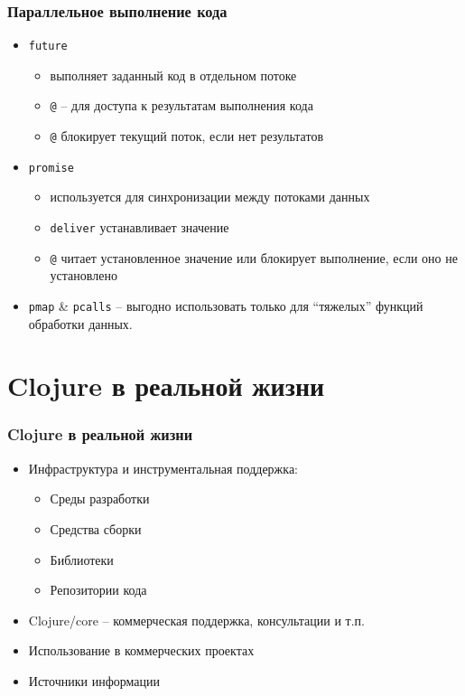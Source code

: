\documentclass[ignorenonframetext]{beamer}
\begin{document}
\begin{frame}[t,fragile]
  \frametitle{Параллельное выполнение кода}
  \begin{itemize}
  \item \texttt{future}
    \begin{itemize}
    \item выполняет заданный код в отдельном потоке
    \item \lstinline|@| -- для доступа к результатам выполнения кода
    \item \lstinline|@| блокирует текущий поток, если нет результатов
    \end{itemize}
  \item \texttt{promise}
    \begin{itemize}
    \item используется для синхронизации между потоками данных
    \item \texttt{deliver} устанавливает значение
    \item \lstinline|@| читает установленное значение или блокирует выполнение, если оно
      не установлено
    \end{itemize}
  \item \texttt{pmap} \& \texttt{pcalls} -- выгодно использовать только для ``тяжелых''
    функций обработки данных.
  \end{itemize}
\end{frame}

\section{Clojure в реальной жизни}

\begin{frame}[t]
  \frametitle{Clojure в реальной жизни}
  \begin{itemize}
  \item Инфраструктура и инструментальная поддержка:
    \begin{itemize}
    \item Среды разработки
    \item Средства сборки
    \item Библиотеки
    \item Репозитории кода
    \end{itemize}
  \item Clojure/core -- коммерческая поддержка, консультации и т.п.
  \item Использование в коммерческих проектах
  \item Источники информации
  \end{itemize}
\end{frame}
\end{document}
